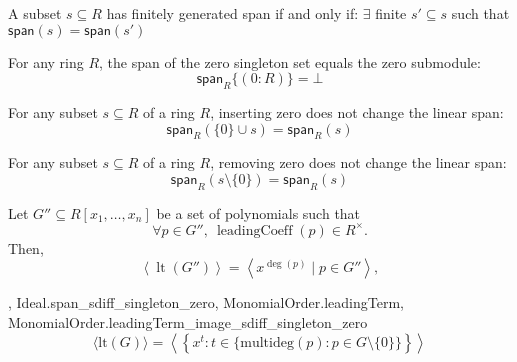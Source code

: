 \begin{lemma}\label{Ideal.fg_span_iff_fg_span_finset_subset}


  A subset $s \subseteq R$ has finitely generated span if and only if:
$\exists$ finite $s' \subseteq s$ such that $\mathsf{span}(s) = \mathsf{span}(s')$

\end{lemma}

\begin{lemma}\label{Ideal.span_singleton_zero}
  \leanok

  For any ring \( R \), the span of the zero singleton set equals the zero submodule:
\[
\mathsf{span}_R \{(0 : R)\} = \bot
\]

\end{lemma}

\begin{lemma}\label{Ideal.span_insert_zero}
  \leanok

  For any subset $s \subseteq R$ of a ring $R$, inserting zero does not change the linear span:
\[
\mathsf{span}_R(\{0\} \cup s) = \mathsf{span}_R(s)
\]

\end{lemma}

\begin{lemma}\label{Ideal.span_sdiff_singleton_zero}
  \leanok
  For any subset $s \subseteq R$ of a ring $R$, removing zero does not change the linear span:
\[
\mathsf{span}_R(s \setminus \{0\}) = \mathsf{span}_R(s)
\]

\end{lemma}

\begin{lemma}\label{MonomialOrder.leadingTerm_ideal_span_monomial}
  \leanok
  Let \( G'' \subseteq R[x_1, \dots, x_n] \) be a set of polynomials such that
\[
\forall p \in G'',\ \operatorname{leadingCoeff}(p) \in R^\times.
\]
Then,
\[
\left\langle \operatorname{lt}(G'') \right\rangle = \left\langle x^{\deg(p)} \mid p \in G'' \right\rangle,
\]

\end{lemma}

\begin{lemma}\label{MonomialOrder.leadingTerm_ideal_span_monomial'}
  \leanok
  ,
{Ideal.span_sdiff_singleton_zero},
{MonomialOrder.leadingTerm},
{MonomialOrder.leadingTerm_image_sdiff_singleton_zero}
  \[
\langle \mathrm{lt}(G) \rangle = \left\langle \left\{ x^t : t \in \{ \mathrm{multideg}(p) : p \in G \setminus \{0\} \} \right\} \right\rangle
\]

\end{lemma}

